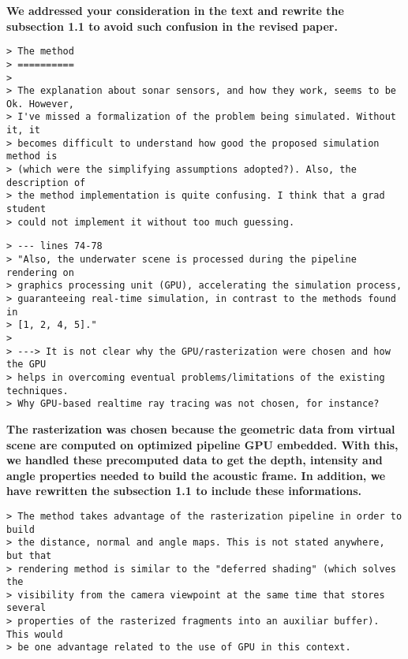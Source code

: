 \documentclass{article}
\begin{document}
\textbf{We addressed your consideration in the text and rewrite the
subsection 1.1 to avoid such confusion in the revised paper.}

\begin{verbatim}
> The method
> ==========
>
> The explanation about sonar sensors, and how they work, seems to be Ok. However,
> I've missed a formalization of the problem being simulated. Without it, it
> becomes difficult to understand how good the proposed simulation method is
> (which were the simplifying assumptions adopted?). Also, the description of
> the method implementation is quite confusing. I think that a grad student
> could not implement it without too much guessing.
\end{verbatim}


\begin{verbatim}
> --- lines 74-78
> "Also, the underwater scene is processed during the pipeline rendering on
> graphics processing unit (GPU), accelerating the simulation process,
> guaranteeing real-time simulation, in contrast to the methods found in
> [1, 2, 4, 5]."
>
> ---> It is not clear why the GPU/rasterization were chosen and how the GPU
> helps in overcoming eventual problems/limitations of the existing techniques.
> Why GPU-based realtime ray tracing was not chosen, for instance?
\end{verbatim}

\textbf{The rasterization was chosen because the geometric data from virtual
scene are computed on optimized pipeline GPU embedded. With this, we handled
these precomputed data to get the depth, intensity and angle properties needed
to build the acoustic frame. In addition, we have rewritten the subsection 1.1
to include these informations.}

\begin{verbatim}
> The method takes advantage of the rasterization pipeline in order to build
> the distance, normal and angle maps. This is not stated anywhere, but that
> rendering method is similar to the "deferred shading" (which solves the
> visibility from the camera viewpoint at the same time that stores several
> properties of the rasterized fragments into an auxiliar buffer). This would
> be one advantage related to the use of GPU in this context.
\end{verbatim}
\end{document}
